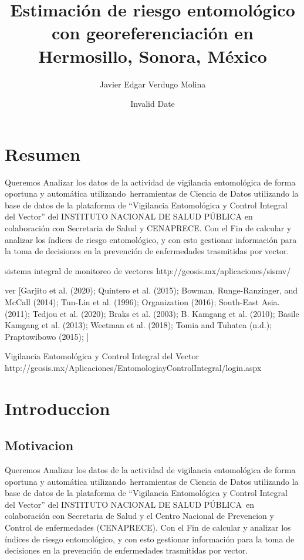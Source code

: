 \documentclass[
  letterpaper,
  twocolumn,
  landscape]{report}
\title{Estimación de riesgo entomológico con georeferenciación en
Hermosillo, Sonora, México}
\author{Javier Edgar Verdugo Molina}
\date{Invalid Date}
\renewcommand*\contentsname{Table of contents}
\newcommand\contentsname{Table of contents}
\begin{document}
\maketitle

\renewcommand*\contentsname{Table of contents}
{
\hypersetup{linkcolor=}
\setcounter{tocdepth}{2}
\tableofcontents
}
\listoffigures
\listoftables
{}

\chapter*{Resumen}\label{resumen}


Queremos Analizar los datos de la actividad de vigilancia entomológica
de forma oportuna y automática utilizando~herramientas de Ciencia de
Datos utilizando la base de datos de la plataforma de ``Vigilancia
Entomológica y Control Integral del Vector'' del INSTITUTO NACIONAL DE
SALUD PÚBLICA en colaboración con Secretaria de Salud y CENAPRECE. Con
el Fin de calcular y analizar los índices de riesgo entomológico, y con
esto gestionar información para la toma de decisiones en la prevención
de enfermedades trasmitidas por vector.

sistema integral de monitoreo de vectores
http://geosis.mx/aplicaciones/sismv/

ver {[}Garjito et al. (2020); Quintero et al. (2015); Bowman,
Runge-Ranzinger, and McCall (2014); Tun-Lin et al. (1996); Organization
(2016); South-East Asia. (2011); Tedjou et al. (2020); Braks et al.
(2003); B. Kamgang et al. (2010); Basile Kamgang et al. (2013); Weetman
et al. (2018); Tomia and Tuhatea (n.d.); Praptowibowo (2015); {]}

Vigilancia Entomológica y Control Integral del Vector
http://geosis.mx/Aplicaciones/EntomologiayControlIntegral/login.aspx


\chapter{Introduccion}\label{introduccion}

\section{Motivacion}\label{motivacion}

Queremos Analizar los datos de la actividad de vigilancia entomológica
de forma oportuna y automática utilizando~herramientas de Ciencia de
Datos utilizando la base de datos de la plataforma de ``Vigilancia
Entomológica y Control Integral del Vector'' del INSTITUTO NACIONAL DE
SALUD PÚBLICA~en colaboración con Secretaria de Salud y el Centro
Nacional de Prevencion y Control de enfermedades (CENAPRECE). Con el Fin
de calcular y analizar los índices de riesgo entomológico, y con esto
gestionar información para la toma de decisiones en la prevención de
enfermedades trasmitidas por vector.
\end{document}
